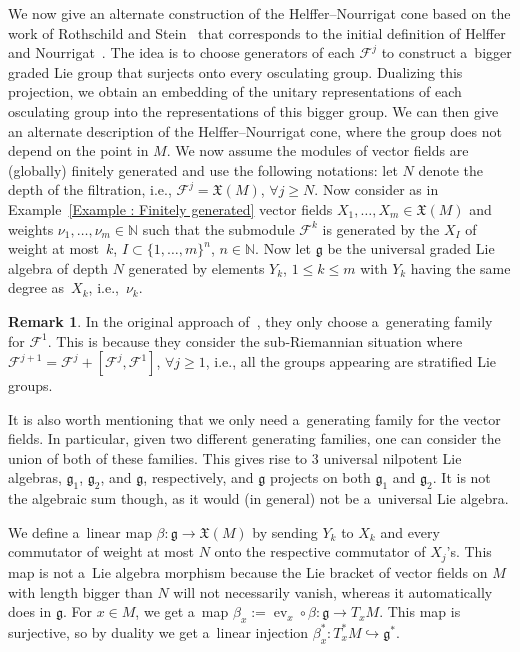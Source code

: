 \documentclass[10pt,a4paper]{article}
\newcommand{\N}{\mathbb N} %
\newcommand{\F}{\mathcal{F}} %
\newcommand{\g}{\mathfrak{g}} %
\newcommand{\ev}{\operatorname{ev}} %
\numberwithin{equation}{section}
\theoremstyle{definition}
\newtheorem{rem}[thm]{Remark}
\begin{document}
We now give an alternate construction of the Helffer--Nourrigat cone based on the work of Rothschild and Stein~\cite{RothschildStein} that corresponds to the initial definition of Helffer and Nourrigat~\cite{HelfferNourrigatPaper}. The idea is to choose generators of each $\F^j$ to construct a~bigger graded Lie group that surjects onto every osculating group. Dualizing this projection, we obtain an embedding of the unitary representations of each osculating group into the representations of this bigger group. We can then give an alternate description of the Helffer--Nourrigat cone, where the group does not depend on the point in $M$. We now assume the modules of vector fields are (globally) finitely generated and use the following notations: let $N$ denote the depth of the filtration, i.e., $\F^j = \mathfrak{X}(M)$, $\forall j \geq N$. Now consider as in Example~\ref{Example : Finitely generated} vector fields $X_1,\dots,X_m \in \mathfrak{X}(M)$ and weights $\nu_1,\dots,\nu_m \in \N$ such that the submodule $\F^k$ is generated by the $X_I$ of weight at most~$k$, $I \subset \{1,\dots,m\}^n$, $n\in \N$. Now let $\mathfrak{g}$ be the universal graded Lie algebra of depth $N$ generated by elements $Y_k$, $1\leq k \leq m $ with $Y_k$ having the same degree as~$X_k$, i.e.,~$\nu_k$.

\begin{rem}
 In the original approach of~\cite{RothschildStein}, they only choose a~generating family for $\F^1$. This is because they consider the sub-Riemannian situation where $\F^{j+1} = \F^j + [\F^j,\F^1]$, $\forall j \geq 1$, i.e., all the groups appearing are stratified Lie groups.

 It is also worth mentioning that we only need a~generating family for the vector fields. In particular, given two different generating families, one can consider the union of both of these families. This gives rise to 3 universal nilpotent Lie algebras, $\g_1$, $\g_2$, and $\g$, respectively, and $\g$ projects on both $\g_1$ and $\g_2$. It is not the algebraic sum though, as it would (in general) not be a~universal Lie algebra.
\end{rem}

We define a~linear map $\beta \colon \g \to \mathfrak{X}(M)$ by sending $Y_k$ to $X_k$ and every commutator of weight at most $N$ onto the respective commutator of $X_j$'s. This map is not a~Lie algebra morphism because the Lie bracket of vector fields on $M$ with length bigger than $N$ will not necessarily vanish, whereas it automatically does in $\g$.
For $x \in M$, we get a~map $\beta_x := \ev_x \circ \beta \colon \g \to T_xM$. This map is surjective, so by duality we get a~linear injection $\beta_x^* \colon T^*_xM \hookrightarrow \g^*$.
\end{document}
